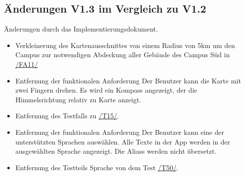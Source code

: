 \subsection*{Änderungen V1.3 im Vergleich zu V1.2}
Änderungen durch das Implementierungsdokument.
\begin{itemize}
    \item Verkleinerung des Kartenausschnittes von einem Radius von 5km um den \Gls{Campus} zur notwendigen Abdeckung aller Gebäude des \Gls{Campus} Süd in \hyperref[/FA11/]{/FA11/}
    \item Entfernung der funktionalen Anforderung \label{/FA15/} \n Der \Gls{Benutzer} kann die \Gls{Karte} mit zwei Fingern drehen. Es wird ein Kompass angezeigt, der die Himmelsrichtung relativ zu \Gls{Karte} anzeigt.
    \item Entfernung des Testfalls \label{/T181/} zu \hyperref[/T15/]{/T15/}.
    \item Entfernung der funktionalen Anforderung \label{/FA51/} \n Der \Gls{Benutzer} kann eine der unterstützten Sprachen auswählen. Alle Texte in der App werden in der ausgewählten Sprache angezeigt. Die \Glspl{Alias} werden nicht übersetzt.
    \item Entfernung des Testteils Sprache von dem Test \hyperref[/T50/]{/T50/}.
\end{itemize}